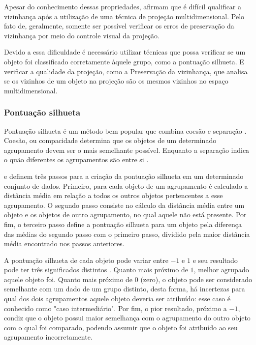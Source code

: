 			Apesar do conhecimento dessas propriedades, 
			afirmam que é difícil qualificar a vizinhança após a utilização de uma técnica
			de projeção multidimensional. Pelo fato de, geralmente, somente ser possível
			verificar os erros de preservação da vizinhança por meio do controle visual
			da projeção.
			
			Devido a essa dificuldade é necessário utilizar técnicas que possa verificar
			se um objeto foi classificado corretamente àquele grupo, como a pontuação
			silhueta. E verificar a qualidade da projeção, como a Preservação da vizinhança,
			que analisa se os vizinhos de um objeto na projeção são os mesmos vizinhos
			no espaço multidimensional.
			
			\subsubsection{Pontuação silhueta}

				Pontuação silhueta é um método bem popular que combina coesão e separação
				\cite{Tan:2005:ch8}. Coesão, ou compacidade determina que os objetos
				de um determinado agrupamento devem ser o mais semelhante possível. Enquanto
				a separação indica o quão diferentes os agrupamentos são entre si
				\cite{Tan:2005:ch8, Berry:1997:DMT:560675}.
				
				 e  definem
				três passos para a criação da pontuação silhueta em um determinado conjunto
				de dados. Primeiro, para cada objeto de um agrupamento é calculado a distância
				média em relação a todos os outros objetos pertencentes a esse agrupamento.
				O segundo passo consiste no cálculo da distância média entre um objeto e 
				os objetos de outro agrupamento, no qual aquele não está presente. Por fim, o
				terceiro passo define a pontuação silhueta para um objeto pela diferença das
				médias do segundo passo com o primeiro passo, dividido pela maior distância média
				encontrado nos passos anteriores.
				
				A pontuação silhueta de cada objeto pode variar entre $-1$ e $1$ e seu resultado
				pode ter três significados distintos \cite{rousseeuw1987silhouettes}.
				Quanto mais próximo de $1$, melhor agrupado aquele objeto foi. Quanto mais
				próximo de $0$ (zero), o objeto pode ser considerado semelhante com um dado
				de um grupo distinto, desta forma, há incertezas para qual dos dois agrupamentos
				aquele objeto deveria ser atribuído: esse caso é conhecido como "caso intermediário".
				Por fim, o pior resultado, próximo a $-1$, condiz que o objeto possui maior
				semelhança com o agrupamento do outro objeto com o qual foi comparado, podendo
				assumir que o objeto foi atribuído ao seu agrupamento incorretamente.
				

